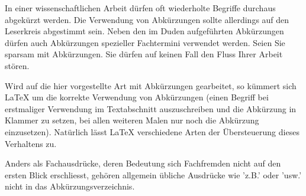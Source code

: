 
In einer wissenschaftlichen Arbeit dürfen oft wiederholte Begriffe durchaus abgekürzt werden. Die Verwendung von Abkürzungen sollte allerdings auf den Leserkreis abgestimmt sein. Neben den im Duden aufgeführten Abkürzungen dürfen auch Abkürzungen spezieller Fachtermini verwendet werden. Seien Sie sparsam mit Abkürzungen. Sie dürfen auf keinen Fall den Fluss Ihrer Arbeit stören.

Wird auf die hier vorgestellte Art mit Abkürzungen gearbeitet, so kümmert sich LaTeX um die korrekte Verwendung von Abkürzungen (einen Begriff bei erstmaliger Verwendung im Textabschnitt auszuschreiben und die Abkürzung in Klammer zu setzen, bei allen weiteren Malen nur noch die Abkürzung einzusetzen). Natürlich lässt LaTeX verschiedene Arten der Übersteuerung dieses Verhaltens zu.

Anders als Fachausdrücke, deren Bedeutung sich Fachfremden nicht auf den ersten Blick erschliesst, gehören allgemein übliche Ausdrücke wie 'z.B.' oder 'usw.' nicht in das Abkürzungsverzeichnis.
